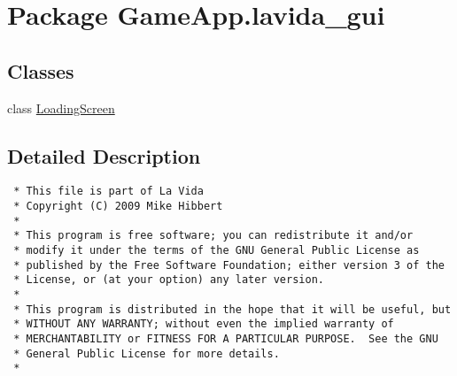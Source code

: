 \hypertarget{namespaceGameApp_1_1lavida__gui}{
\section{Package GameApp.lavida\_\-gui}
\label{namespaceGameApp_1_1lavida__gui}
}


\subsection*{Classes}
\begin{CompactItemize}
\item 
class \hyperlink{classGameApp_1_1lavida__gui_1_1LoadingScreen}{LoadingScreen}
\end{CompactItemize}


\subsection{Detailed Description}


\footnotesize\begin{verbatim}
 * This file is part of La Vida
 * Copyright (C) 2009 Mike Hibbert
 *
 * This program is free software; you can redistribute it and/or
 * modify it under the terms of the GNU General Public License as
 * published by the Free Software Foundation; either version 3 of the
 * License, or (at your option) any later version.
 *
 * This program is distributed in the hope that it will be useful, but
 * WITHOUT ANY WARRANTY; without even the implied warranty of
 * MERCHANTABILITY or FITNESS FOR A PARTICULAR PURPOSE.  See the GNU
 * General Public License for more details.
 *
\end{verbatim}
\normalsize
 